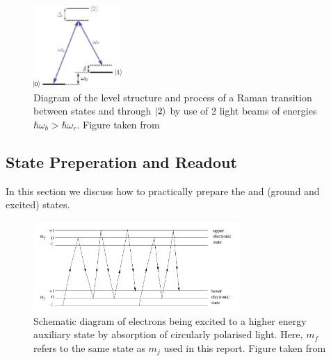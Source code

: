 \begin{figure}[H]
    \centering
    \includegraphics[width=0.3\textwidth]{images/TIQC_raman.jpg}
    \caption{Diagram of the level structure and process of a Raman transition between states \kz and \ko through $\ket{2}$ by use of 2 light beams of energies $\hbar \omega_b > \hbar \omega_r$. Figure taken from \cite{schaferFastGatesMixedSpecies2020}}\label{fig:TIQC_raman}
\end{figure}

\subsection{State Preperation and Readout}\label{sec:trappedreadout}


In this section we discuss how to practically prepare the \kz and \ko (ground and excited) states.  

\begin{figure}[H]
    \centering
    \includegraphics[width=0.7\textwidth]{images/States.png}
    \caption{Schematic diagram of electrons being excited to a higher energy auxiliary state by absorption of circularly polarised light. Here, $m_f$ refers to the same state as $m_j$ used in this report. Figure taken from \cite{JLExp11}}\label{fig:States}
\end{figure}

